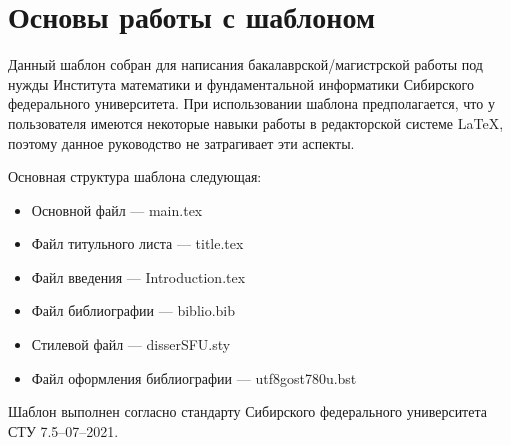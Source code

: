 
\chapter{Основы работы с шаблоном} 

Данный шаблон собран для написания бакалаврской/магистрской работы под нужды Института математики и фундаментальной информатики Сибирского федерального университета. При использовании шаблона предполагается, что у пользователя имеются некоторые навыки работы в редакторской системе \LaTeX, поэтому данное руководство не затрагивает эти аспекты.

Основная структура шаблона следующая:
\begin{itemize}
    \item Основной файл --- main.tex
    \item Файл титульного листа --- title.tex
    \item Файл введения --- Introduction.tex
    \item Файл библиографии --- biblio.bib
    \item Стилевой файл --- disserSFU.sty
    \item Файл оформления библиографии --- utf8gost780u.bst
\end{itemize}

Шаблон выполнен согласно стандарту Сибирского федерального университета СТУ 7.5--07--2021.

 
 

 



